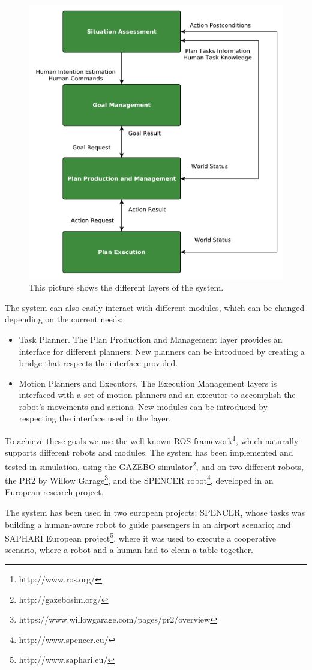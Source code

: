  \begin{figure}[h!]
	\centering
	\includegraphics[scale=0.45]{img/intro/system_architecture.pdf}
	\caption[System architecture]{This picture shows the different layers of the system.}
	\label{fig:intro-system_architecture}
\end{figure}

The system can also easily interact with different modules, which can be changed depending on the current needs:
\begin{itemize}
\item Task Planner. The Plan Production and Management layer provides an interface for different planners. New planners can be introduced by creating a bridge that respects the interface provided.
\item Motion Planners and Executors. The Execution Management layers is interfaced with a set of motion planners and an executor to accomplish the robot's movements and actions. New modules can be introduced by respecting the interface used in the layer.
\end{itemize}


To achieve these goals we use the well-known ROS framework\footnote{http://www.ros.org/}, which naturally supports different robots and modules. The system has been implemented and tested in simulation, using the GAZEBO simulator\footnote{http://gazebosim.org/}, and on two different robots, the PR2 by Willow Garage\footnote{https://www.willowgarage.com/pages/pr2/overview}, and the SPENCER robot\footnote{http://www.spencer.eu/}, developed in an European research project. 

The system has been used in two european projects: SPENCER, whose tasks was building a human-aware robot to guide passengers in an airport scenario; and SAPHARI European project\footnote{http://www.saphari.eu/}, where it was used to execute a cooperative scenario, where a robot and a human had to clean a table together.